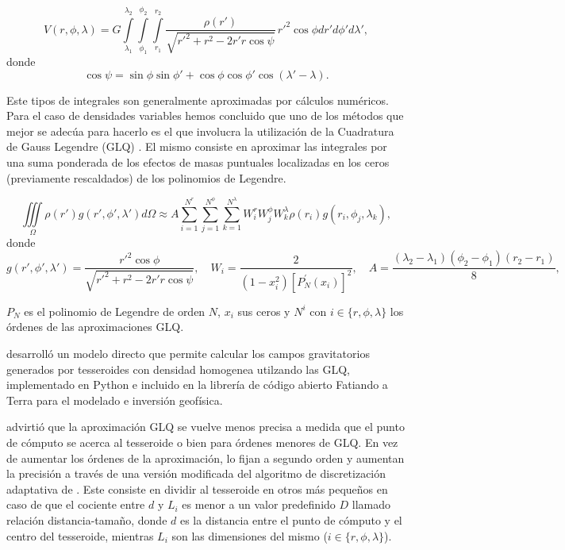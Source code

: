 \documentclass[a4paper,10pt]{article}
\begin{document}
\begin{equation}
    V(r,\phi,\lambda) = G 
    \int\limits_{\lambda_1}^{\lambda_2}
    \int\limits_{\phi_1}^{\phi_2}
    \int\limits_{r_1}^{r_2}
    \frac{\rho(r')}{\sqrt{{r'}^2 + r^2 - 2 r' r \cos \psi}} \, 
    r'^2 \cos \phi  dr' d\phi' d\lambda',
\label{eq:tesseroid-pot}
\end{equation}
\noindent donde
\begin{equation}
    \cos\psi = \sin\phi\sin\phi' + \cos\phi\cos\phi'
                 \cos(\lambda' - \lambda).
\label{eq:cospsi}
\end{equation}

Este tipos de integrales son generalmente aproximadas por cálculos numéricos.
Para el caso de densidades variables hemos concluido que uno de los métodos que mejor se adecúa para hacerlo es el que involucra la utilización de la Cuadratura de Gauss Legendre (GLQ) \citep{Asgharzadeh2007, Uieda2016, Uieda2017}.
El mismo consiste en aproximar las integrales por una suma ponderada de los efectos de masas puntuales localizadas en los ceros (previamente rescaldados) de los polinomios de Legendre.

\begin{equation}
    \iiint\limits_\Omega \rho(r') g(r', \phi', \lambda') d\Omega \approx
    A 
    \sum\limits_{i=1}^{N^r}
    \sum\limits_{j=1}^{N^\phi}
    \sum\limits_{k=1}^{N^\lambda}
    W_i^r W_j^\phi W_k^\lambda \rho(r_i) g(r_i, \phi_j, \lambda_k),
\label{eq:glq-var-dens}
\end{equation}
\noindent donde
\begin{equation}
    g(r', \phi', \lambda') =
    \frac{r'^2 \cos \phi}{\sqrt{{r'}^2 + r^2 - 2 r' r \cos \psi}},
    \quad
    W_i = \frac{2}{(1-x_i^2)[P_N^\prime(x_i)]^2},
    \quad
    A = \frac{(\lambda_2 - \lambda_1)(\phi_2 - \phi_1)(r_2 - r_1)}{8},
\end{equation}

\noindent $P_N$ es el polinomio de Legendre de orden $N$, $x_i$ sus ceros y $N^i$ con $i \in \{ r, \phi, \lambda\}$ los órdenes de las aproximaciones GLQ.

\citet{Uieda2016} desarrolló un modelo directo que permite calcular los campos gravitatorios generados por tesseroides con densidad homogenea utilzando las GLQ, implementado en Python e incluido en la librería de código abierto Fatiando a Terra \citep{Uieda2013} para el modelado e inversión geofísica.

\citet{Ku1977} advirtió que la aproximación GLQ se vuelve menos precisa a medida que el punto de cómputo se acerca al tesseroide o bien para órdenes menores de GLQ.
En vez de aumentar los órdenes de la aproximación, \citet{Uieda2016} lo fijan a segundo orden y aumentan la precisión a través de una versión modificada del algoritmo de discretización adaptativa de \citet{Li2011}.
Este consiste en dividir al tesseroide en otros más pequeños en caso de que el cociente entre $d$ y $L_i$ es menor a un valor predefinido $D$ llamado relación distancia-tamaño, donde $d$ es la distancia entre el punto de cómputo y el centro del tesseroide, mientras $L_i$ son las dimensiones del mismo ($i \in \{ r, \phi, \lambda\}$).
\end{document}

